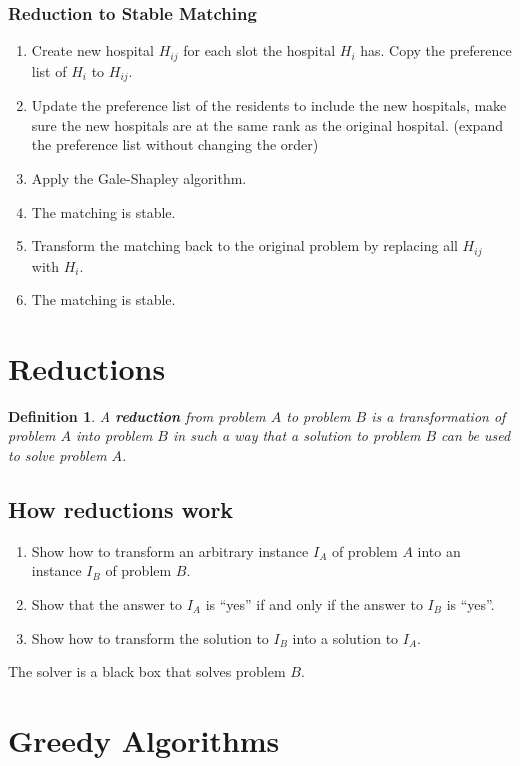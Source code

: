 \documentclass[11pt,fleqn]{article}
\newtheorem*{definition}{Definition}
\begin{document}
\subsubsection{Reduction to Stable Matching}
\begin{enumerate}
    \item Create new hospital $H_{ij}$ for each slot the hospital $H_i$ has. Copy the preference list of $H_i$ to $H_{ij}$.
    \item Update the preference list of the residents to include the new hospitals, make sure the new hospitals are at the same rank as the original hospital. (expand the preference list without changing the order)
    \item Apply the Gale-Shapley algorithm.
    \item The matching is stable.
    \item Transform the matching back to the original problem by replacing all $H_{ij}$ with $H_i$.
    \item The matching is stable.
\end{enumerate}


\section{Reductions}
\begin{definition}
    A \textbf{reduction} from problem $A$ to problem $B$ is a transformation of problem $A$ into problem $B$ in such a way that a solution to problem $B$ can be used to solve problem $A$.
\end{definition}

\subsection{How reductions work}
\begin{enumerate}
    \item Show how to transform an arbitrary instance $I_A$ of problem $A$ into an instance $I_B$ of problem $B$.
    \item Show that the answer to $I_A$ is ``yes'' if and only if the answer to $I_B$ is ``yes''.
    \item Show how to transform the solution to $I_B$ into a solution to $I_A$.
\end{enumerate}
The solver is a black box that solves problem $B$.

\section{Greedy Algorithms}
\end{document}
